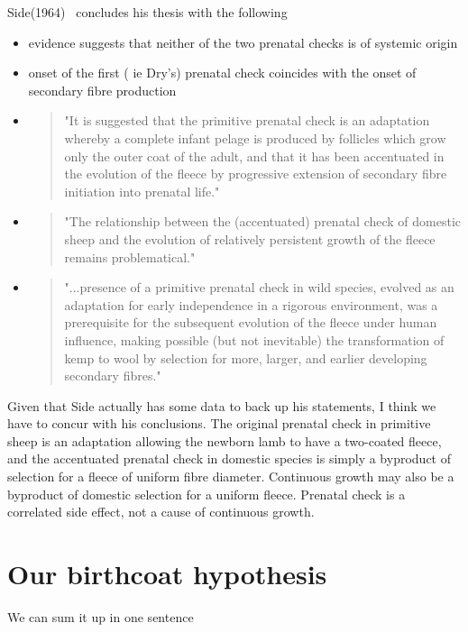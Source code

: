 \documentclass[titlepage]{article}  %
\begin{document}
Side(1964)~\cite{side:64} concludes his thesis with the following
\begin{itemize}
\item evidence suggests that neither of the two prenatal checks is of systemic origin
\item onset of the first ( ie Dry's) prenatal check coincides with the onset of secondary fibre production
\item \begin{quote}
"It is suggested that the primitive prenatal check is an adaptation whereby a complete infant pelage is produced by follicles which grow only the outer coat of the adult, and that it has been accentuated in the evolution of the fleece by progressive extension of secondary fibre initiation into prenatal life."
\end{quote}
\item \begin{quote}
"The relationship between the (accentuated) prenatal check of domestic sheep and the evolution of relatively persistent growth of the fleece remains problematical."
\end{quote}
\item \begin{quote}
"...presence of a primitive prenatal check in wild species, evolved as an adaptation for early independence in a rigorous environment, was a prerequisite for the subsequent evolution of the fleece under human influence, making possible (but not inevitable) the transformation of kemp to wool by selection for more, larger, and earlier developing secondary fibres."
\end{quote}
\end{itemize}

Given that Side actually has some data to back up his statements, I think we have to concur with his conclusions.  The original prenatal check in primitive sheep is an adaptation allowing the newborn lamb to have a two-coated fleece, and the accentuated prenatal check in domestic species is simply a byproduct of selection for a fleece of uniform fibre diameter. Continuous growth may also be a byproduct of domestic selection for a uniform fleece. Prenatal check is a correlated side effect, not a cause of continuous growth.


\section{Our birthcoat hypothesis}
We can sum it up in one sentence
\end{document}
